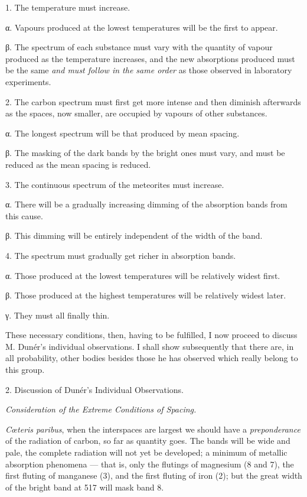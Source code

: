 \documentclass[a4paper, 12pt, oneside, polutonikogreek, english]{article}
\begin{document}
1. The temperature must increase.

α. Vapours produced at the lowest temperatures will be the first to appear.

β. The spectrum of each substance must vary with the quantity of vapour produced as the temperature increases, and the new absorptions produced must be the same \emph{and must follow in the same order} as those observed in laboratory experiments.

2. The carbon spectrum must first get more intense and then diminish afterwards as the spaces, now smaller, are occupied by vapours of other substances.

α. The longest spectrum will be that produced by mean spacing.

β. The masking of the dark bands by the bright ones must vary, and must be reduced as the mean spacing is reduced.

3. The continuous spectrum of the meteorites must increase.

α. There will be a gradually increasing dimming of the absorption bands from this cause.

β. This dimming will be entirely independent of the width of the band.

4. The spectrum must gradually get richer in absorption bands.

α. Those produced at the lowest temperatures will be relatively widest first.

β. Those produced at the highest temperatures will be relatively widest later.

γ. They must all finally thin.

These necessary conditions, then, having to be fulfilled, I now proceed to discuss M. Dunér's individual observations. I shall show subsequently that there are, in all probability, other bodies besides those he has observed which really belong to this group.

2. Discussion of Dunér's Individual Observations.

\emph{Consideration of the Extreme Conditions of Spacing.}

\emph{Cœteris paribus}, when the interspaces are largest we should have a \emph{preponderance} of the radiation of carbon, so far as quantity goes. The bands will be wide and pale, the complete radiation will not yet be developed; a minimum of metallic absorption phenomena --- that is, only the flutings of magnesium (8 and 7), the first fluting of manganese (3), and the first fluting of iron (2); but the great width of the bright band at 517 will mask band 8.
\end{document}
